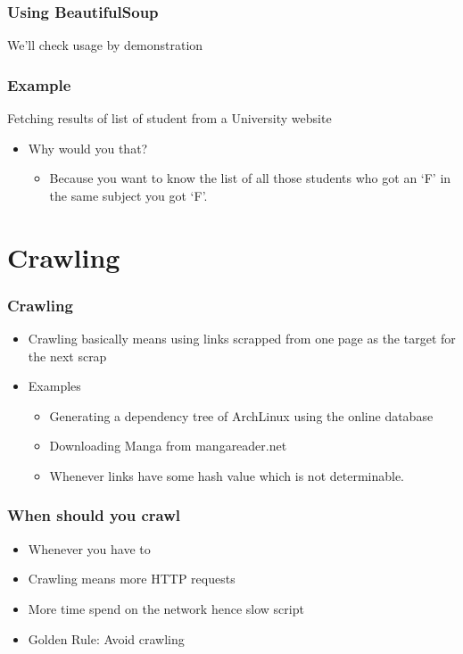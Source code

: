 \documentclass{beamer}
\begin{document}
\begin{frame}
\frametitle{Using BeautifulSoup}
\label{sec-4_10}

   We'll check usage by demonstration
\end{frame}
\begin{frame}
\frametitle{Example}
\label{sec-4_11}

  Fetching results of list of student from a University website

\begin{itemize}
\item Why would you that?
\begin{itemize}
\item Because you want to know the list of all those students who got an `F' in the same subject you got `F'.
\end{itemize}
\end{itemize}
   
\end{frame}
\section{Crawling}
\label{sec-5}
\begin{frame}
\frametitle{Crawling}
\label{sec-5_1}


\begin{itemize}
\item Crawling basically means using links scrapped from one page as the target for the next scrap
\item Examples
\begin{itemize}
\item Generating a dependency tree of ArchLinux using the online database
\item Downloading Manga from mangareader.net
\item Whenever links have some hash value which is not determinable.
\end{itemize}
\end{itemize}
\end{frame}
\begin{frame}
\frametitle{When should you crawl}
\label{sec-5_2}


\begin{itemize}
\item Whenever you have to
\item Crawling means more HTTP requests
\item More time spend on the network hence slow script
\item Golden Rule: Avoid crawling
\end{itemize}
\end{frame}
\end{document}
